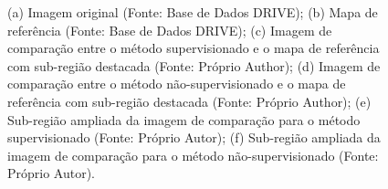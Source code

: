 \begin{figure}[!h]
    \caption{(a) Imagem original (Fonte: Base de Dados DRIVE); (b) Mapa de refer\^{e}ncia (Fonte: Base de Dados DRIVE); (c) Imagem de compara\c{c}\~{a}o entre o m\'{e}todo supervisionado e o mapa de refer\^{e}ncia com sub-regi\~{a}o destacada (Fonte: Pr\'{o}prio Author); (d) Imagem de compara\c{c}\~{a}o entre o m\'{e}todo n\~{a}o-supervisionado e o mapa de refer\^{e}ncia com sub-regi\~{a}o destacada (Fonte: Pr\'{o}prio Author); (e) Sub-regi\~{a}o ampliada da imagem de compara\c{c}\~{a}o para o m\'{e}todo supervisionado (Fonte: Pr\'{o}prio Autor); (f) Sub-regi\~{a}o ampliada da imagem de compara\c{c}\~{a}o para o m\'{e}todo n\~{a}o-supervisionado (Fonte: Pr\'{o}prio Autor).}
    \label{Fig:exemplesArea}
\end{figure}


